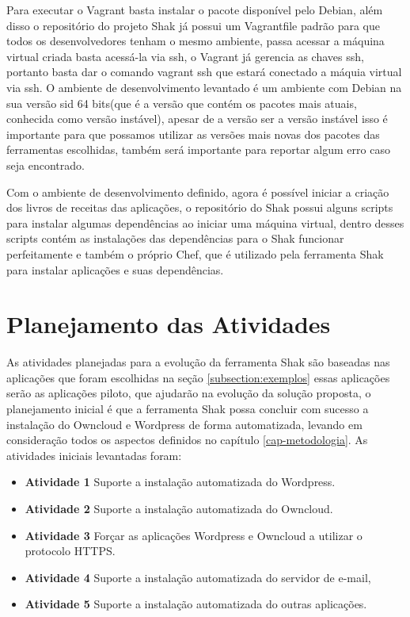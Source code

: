 Para executar o Vagrant basta instalar o pacote disponível pelo Debian, além disso
o repositório do projeto Shak já possui um Vagrantfile padrão para que todos os
desenvolvedores tenham o mesmo ambiente, passa acessar a máquina virtual criada
basta acessá-la via ssh, o Vagrant já gerencia as chaves ssh, portanto basta
dar o comando vagrant ssh que estará conectado a máquia virtual via ssh.
O ambiente de desenvolvimento levantado é um ambiente com Debian na sua versão
sid 64 bits(que é a versão que contém os pacotes mais atuais, conhecida como versão instável),
apesar de a versão ser a versão instável isso é importante para que possamos
utilizar as versões mais novas dos pacotes das ferramentas escolhidas, também
será importante para reportar algum erro caso seja encontrado.

Com o ambiente de desenvolvimento definido, agora é possível iniciar a criação dos
livros de receitas das aplicações, o repositório do Shak possui alguns scripts
para instalar algumas dependências ao iniciar uma máquina virtual, dentro
desses scripts contém as instalações das dependências para o Shak funcionar perfeitamente
e também o próprio Chef, que é utilizado pela ferramenta Shak para instalar aplicações
e suas dependências.


\section{Planejamento das Atividades}

As atividades planejadas para a evolução da ferramenta Shak são baseadas nas aplicações que foram escolhidas na seção
\ref{subsection:exemplos} essas aplicações serão as aplicações piloto, que ajudarão na evolução
da solução proposta, o planejamento inicial é que a ferramenta Shak possa concluir com sucesso
a instalação do Owncloud e Wordpress de forma automatizada,
levando em consideração todos os aspectos definidos no capítulo
\ref{cap-metodologia}. As atividades iniciais levantadas foram:

 \begin{itemize}
   \item \textbf{Atividade 1} Suporte a instalação automatizada do Wordpress.
   \item \textbf{Atividade 2} Suporte a instalação automatizada do Owncloud.
   \item \textbf{Atividade 3} Forçar as aplicações Wordpress e Owncloud a
   utilizar o protocolo HTTPS.
   \item \textbf{Atividade 4} Suporte a instalação automatizada do servidor de e-mail,
   \item \textbf{Atividade 5} Suporte a instalação automatizada do outras aplicações.
 \end{itemize}

